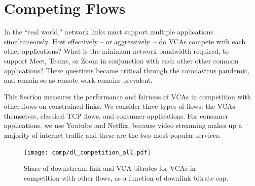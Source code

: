 



\section{Competing Flows}

In the ``real world," network links must support multiple applications simultaneously.
How effectively -- or aggressively~-- do VCAs compete with each other applications?
What is the minimum network bandwidth required, to support Meet, Teams, or Zoom 
    in conjunction with each other other common applications?
These questions became critical through the coronavirus pandemic,
  and remain so as remote work remains prevalent.
    
This Section measures the performance and fairness of VCAs
    in competition with other flows on constrained links.
We consider three types of flows: 
  the VCAs themselves, classical TCP flows, and consumer applications.
For consumer applications, we use Youtube and Netflix,
  because video streaming makes up a majority of internet traffic and 
  these are the two most popular services.



\begin{figure}[t]
    \texttt{[image: comp/dl\_competition\_all.pdf]}
    \caption{Share of downstream link and VCA bitrates for VCAs in competition with other flows, as a function of downlink bitrate cap.}
	\label{fig:comp_bitrates_dl}
\end{figure}

